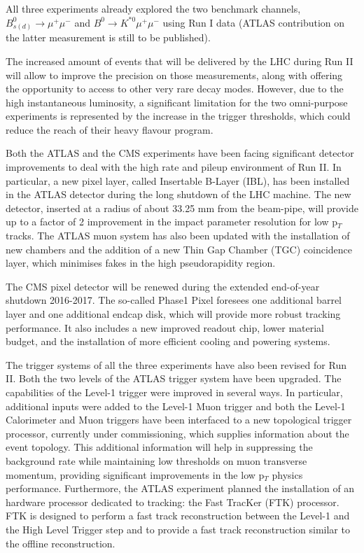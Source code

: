All three experiments already explored the two benchmark channels, $B^0_{s(d)} \to \mu^+\mu^-$ and $B^0 \to K^{\ast 0}\mu^+\mu^-$ using Run I data (ATLAS contribution on the latter measurement is still to be published).

The increased amount of events that will be delivered by the LHC during Run II will allow to improve the precision on those measurements, along with offering the opportunity to access to other very rare decay modes.
However, due to the high instantaneous luminosity, a significant limitation for the two omni-purpose experiments is represented by the increase in the trigger thresholds, which could reduce the reach of their heavy flavour program.

Both the ATLAS and the CMS experiments have been facing significant detector improvements to deal with the high rate and pileup environment of Run II. 
In particular, a new pixel layer, called Insertable B-Layer (IBL), has been installed in the ATLAS detector during the long shutdown of the LHC machine. 
The new detector, inserted at a radius of about 33.25 mm from the beam-pipe, will provide up to a factor of 2 improvement in the impact parameter resolution for low p$_T$ tracks.
The ATLAS muon system has also been updated with the installation of new chambers and the addition of a new Thin Gap Chamber (TGC) coincidence layer, which minimises fakes in the high pseudorapidity region.

The CMS pixel detector will be renewed during the extended end-of-year shutdown 2016-2017. 
The so-called Phase1 Pixel foresees one additional barrel layer and one additional endcap disk, which will provide more robust tracking performance. 
It also includes a new improved readout chip, lower material budget, and the installation of more efficient cooling and powering systems.


The trigger systems of all the three experiments have also been revised for Run II.
Both the two levels of the ATLAS trigger system have been upgraded.
The capabilities of the Level-1 trigger were improved in several ways.
In particular, additional inputs were added to the Level-1 Muon trigger and both the Level-1 Calorimeter and Muon triggers have been interfaced to a new topological trigger processor, currently under commissioning, which supplies information about the event topology. 
This additional information will help in suppressing the background rate while maintaining low thresholds on muon transverse momentum, providing significant improvements in the low p$_T$ physics performance.
Furthermore, the ATLAS experiment planned the installation of an hardware processor dedicated to tracking: the Fast TracKer (FTK) processor. 
FTK is designed to perform a fast track reconstruction between the Level-1 and the High Level Trigger step and to provide a fast track reconstruction similar to the offline reconstruction.

